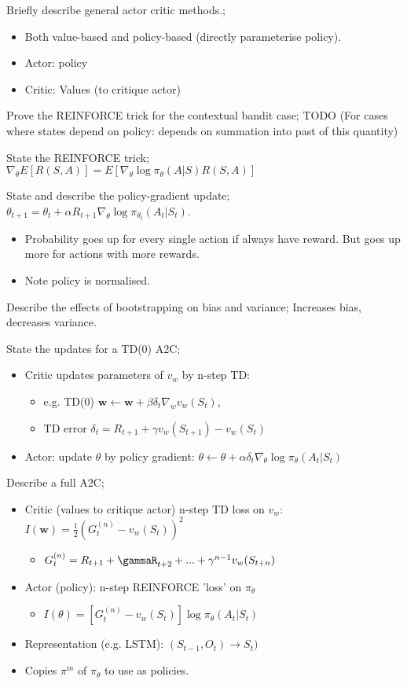 \documentclass{article}
\begin{document}
Briefly describe general actor critic methods.; \begin{itemize} \item Both value-based and policy-based (directly parameterise policy). \item Actor: policy \item Critic: Values (to critique actor) \end{itemize}

Prove the REINFORCE trick for the contextual bandit case; TODO (For cases where states depend on policy: depends on summation into past of this quantity)

State the REINFORCE trick; $\nabla_\theta E[R(S,A)]=E[\nabla_\theta\log\pi_{\theta}(A|S)R(S,A)]$

State and describe the policy-gradient update; $\theta_{t+1}=\theta_t + \alpha R_{t+1}\nabla_\theta\log\pi_{\theta_t}(A_t|S_t)$. \begin{itemize}
    \item Probability goes up for every single action if always have reward. But goes up more for actions with more rewards.
    \item Note policy is normalised.
\end{itemize}

Describe the effects of bootstrapping on bias and variance; Increases bias, decreases variance.

State the updates for a TD(0) A2C; \begin{itemize}
    \item Critic updates parameters of $v_w$ by n-step TD: \begin{itemize}
        \item e.g. TD(0) $\mathbf{w}\leftarrow\mathbf{w}+\beta\delta_t\nabla_wv_w(S_t)$, \item TD error $\delta_t=R_{t+1}+\gamma v_w(S_{t+1}) - v_w(S_t)$
    \end{itemize} 
    \item Actor: update $\theta$ by policy gradient: $\theta \leftarrow \theta + \alpha\delta_t\nabla_\theta \log \pi_\theta (A_t|S_t)$
\end{itemize}

Describe a full A2C; \begin{itemize}
    \item Critic (values to critique actor) n-step TD loss on $v_w$: $I(\mathbf{w}) = \frac{1}{2}(G_t^{(n)}-v_w(S_t))^2$ \begin{itemize}
        \item $G_t^{(n)}=R_{t+1}+\gammaR_{t+2}+...+\gamma^{n-1}v_w(S_{t+n})$
    \end{itemize}
    \item Actor (policy): n-step REINFORCE 'loss' on $\pi_\theta$ \begin{itemize}
        \item $I(\theta) = [G_t^{(n)} - v_w(S_t)]\log\pi_{\theta}(A_t|S_t)$
    \end{itemize}
    \item Representation (e.g. LSTM): $(S_{t-1}, O_t) \rightarrow S_t)$
    \item Copies $\pi^m$ of $\pi_\theta$ to use as policies.
\end{itemize}
\end{document}
